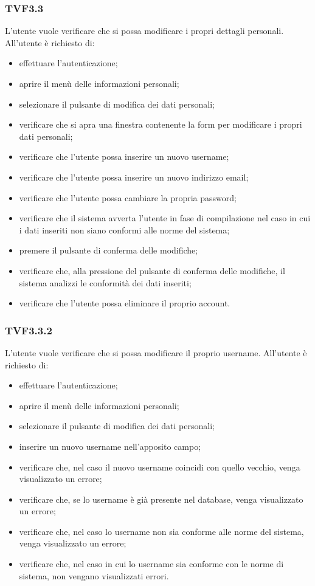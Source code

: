 		\subsubsection{TVF3.3}
			L'utente vuole verificare che si possa modificare i propri dettagli personali. All'utente è richiesto di:
			\begin{itemize}
				\item effettuare l'autenticazione;
				\item aprire il menù delle informazioni personali;
				\item selezionare il pulsante di modifica dei dati personali;
				\item verificare che si apra una finestra contenente la form per modificare i propri dati personali;
				\item verificare che l'utente possa inserire un nuovo username;
				\item verificare che l'utente possa inserire un nuovo indirizzo email;
				\item verificare che l'utente possa cambiare la propria password;
				\item verificare che il sistema avverta l'utente in fase di compilazione nel caso in cui i dati inseriti non siano conformi alle norme del sistema;
				\item premere il pulsante di conferma delle modifiche;
				\item verificare che, alla pressione del pulsante di conferma delle modifiche, il sistema analizzi le conformità dei dati inseriti;
				\item verificare che l'utente possa eliminare il proprio account.
			\end{itemize}
		
		\subsubsection{TVF3.3.2}
			L'utente vuole verificare che si possa modificare il proprio username. All'utente è richiesto di:
			\begin{itemize}
				\item effettuare l'autenticazione;
				\item aprire il menù delle informazioni personali;
				\item selezionare il pulsante di modifica dei dati personali;
				\item inserire un nuovo username nell'apposito campo;
				\item verificare che, nel caso il nuovo username coincidi con quello vecchio, venga visualizzato un errore;
				\item verificare che, se lo username è già presente nel database, venga visualizzato un errore;
				\item verificare che, nel caso lo username non sia conforme alle norme del sistema, venga visualizzato un errore;
				\item verificare che, nel caso in cui lo username sia conforme con le norme di sistema, non vengano visualizzati errori.
			\end{itemize}
			
